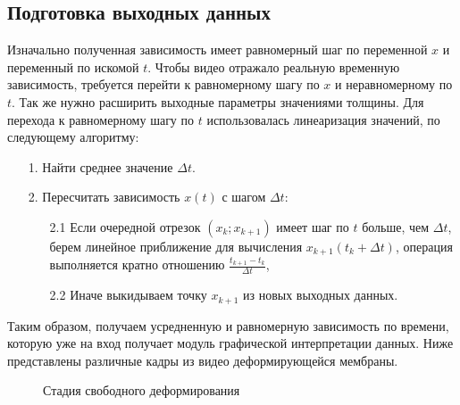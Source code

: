 \subsection{Подготовка выходных данных}
Изначально полученная зависимость имеет равномерный шаг по переменной $x$ и переменный по искомой $t$. Чтобы видео отражало реальную временную зависимость, требуется перейти к равномерному шагу по $x$ и неравномерному по $t$.
Так же нужно расширить выходные параметры значениями толщины. Для перехода к равномерному шагу по $t$ использовалась линеаризация значений, по следующему алгоритму:
\begin{itemize}
\item[1.] Найти среднее значение $\Delta t$.
\item[2.] Пересчитать зависимость $x(t)$ с шагом $\Delta t$:
\begin{itemize}
	\item[2.1] Если очередной отрезок $(x_k; x_{k+1})$ имеет шаг по $t$ больше, чем $\Delta t$, берем линейное приближение для вычисления $x_{k+1}(t_k+\Delta t)$, операция выполняется кратно отношению $\frac{t_{k+1}-t_k}{\Delta t}$,
	\item[2.2] Иначе выкидываем точку $x_{k+1}$ из новых выходных данных.
\end{itemize}
\end{itemize} 
Таким образом, получаем усредненную и равномерную зависимость по времени, которую уже на вход получает модуль графической интерпретации данных. Ниже представлены различные 
кадры из видео деформирующейся мембраны.
		\begin{figure}[h!]	
				\def\svgwidth{\columnwidth}
				\caption{Стадия свободного деформирования}				
				\label{animate1}
		\end{figure}

